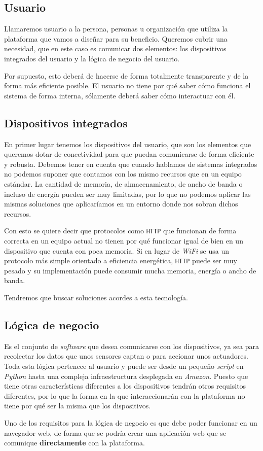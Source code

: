 \subsection{Usuario}

Llamaremos usuario a la persona, personas u organización que utiliza la plataforma
que vamos a diseñar para su beneficio. Queremos cubrir una necesidad, que en
este caso es comunicar dos elementos: los dispositivos integrados del usuario y
la lógica de negocio del usuario.

Por supuesto, esto deberá de hacerse de forma totalmente transparente y de la
forma más eficiente posible. El usuario no tiene por qué saber cómo funciona
el sistema de forma interna, sólamente deberá saber cómo interactuar con él.

\subsection{Dispositivos integrados}

En primer lugar tenemos los dispositivos del usuario, que son los
elementos que queremos dotar de conectividad para que puedan comunicarse de
forma eficiente y robusta. Debemos tener en cuenta que cuando hablamos de
sistemas integrados no podemos suponer que contamos con los mismo recursos
que en un equipo estándar. La cantidad de memoria, de almacenamiento, de
ancho de banda o incluso de energía pueden ser muy limitadas, por lo que no
podemos aplicar las mismas soluciones que aplicaríamos en un entorno donde
nos sobran dichos recursos.

Con esto se quiere decir que protocolos como \texttt{HTTP} que funcionan de
forma correcta en un equipo actual no tienen por qué funcionar igual de bien
en un dispositivo que cuenta con poca memoria.
Si en lugar de \emph{WiFi} se usa un protocolo más simple orientado a eficiencia
energética, \texttt{HTTP} puede ser muy pesado y su implementación puede consumir
mucha memoria, energía o ancho de banda.

Tendremos que buscar soluciones acordes a esta tecnología.

\subsection{Lógica de negocio}

Es el conjunto de \emph{software} que desea comunicarse con los dispositivos, ya
sea para recolectar los datos que unos sensores captan o para accionar unos actuadores.
Toda esta lógica pertenece al usuario y puede ser desde un pequeño \emph{script}
en \emph{Python} hasta una compleja infraestructura desplegada en \emph{Amazon}.
Puesto que tiene otras características diferentes a los dispositivos tendrán otros
requisitos diferentes, por lo que la forma en la que interaccionarán con la plataforma
no tiene por qué ser la misma que los dispositivos.

Uno de los requisitos para la lógica de negocio es que debe poder funcionar en
un navegador web, de forma que se podría crear una aplicación web que se comunique
\textbf{directamente} con la plataforma.
